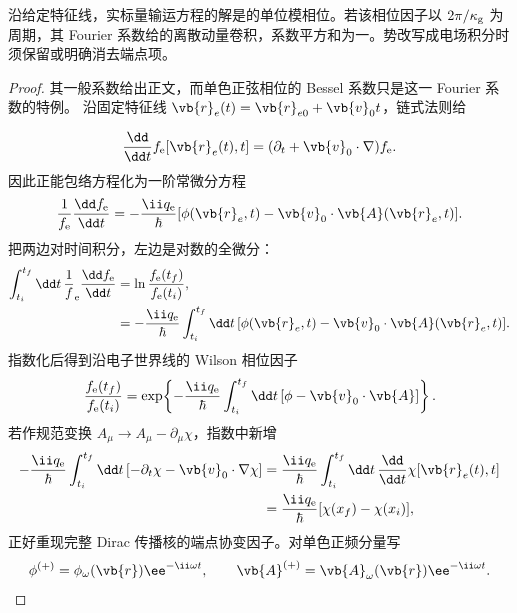 \begin{proposition}[实周期程函相位的动量卷积]
沿给定特征线，实标量输运方程的解是的单位模相位。若该相位因子以 $2\pi/\kappa_{\rm g}$ 为周期，其 Fourier 系数给的离散动量卷积，系数平方和为一。势改写成电场积分时须保留或明确消去端点项。
\end{proposition}
\begin{proof}
其一般系数给出正文，而单色正弦相位的 Bessel 系数只是这一 Fourier 系数的特例。 沿固定特征线 $\vb{r}_e(t)=\vb{r}_{e0}+\vb{v}_0t$，链式法则给

\begin{equation*}
\frac{\dd}{\dd t}f_{\mathrm e}[\vb{r}_e(t),t]
=(\partial_t+\vb{v}_0\cdot\nabla)f_{\mathrm e}.
\end{equation*}
因此正能包络方程化为一阶常微分方程
\begin{equation*}
\frac{1}{f_{\mathrm e}}\frac{\dd f_{\mathrm e}}{\dd t}
=-\frac{\ii q_{\mathrm e}}{\hbar}
[\phi(\vb{r}_e,t)-\vb{v}_0\cdot\vb{A}(\vb{r}_e,t)].
\end{equation*}
把两边对时间积分，左边是对数的全微分：
\begin{align*}
\int_{t_i}^{t_f}\dd t\,\frac1f_{\mathrm e}\frac{\dd f_{\mathrm e}}{\dd t}
&=\ln\frac{f_{\mathrm e}(t_f)}{f_{\mathrm e}(t_i)},\\
&=-\frac{\ii q_{\mathrm e}}{\hbar}\int_{t_i}^{t_f}\dd t\,
[\phi(\vb{r}_e,t)-\vb{v}_0\cdot\vb{A}(\vb{r}_e,t)].
\end{align*}
指数化后得到沿电子世界线的 Wilson 相位因子
\begin{equation*}
\frac{f_{\mathrm e}(t_f)}{f_{\mathrm e}(t_i)}
=\exp\!\left\{-\frac{\ii q_{\mathrm e}}{\hbar}\int_{t_i}^{t_f}\dd t\,
[\phi-\vb{v}_0\cdot\vb{A}]\right\}.
\end{equation*}
若作规范变换
$A_\mu\to A_\mu-\partial_\mu\chi$，指数中新增
\begin{align*}
-\frac{\ii q_{\mathrm e}}{\hbar}
\int_{t_i}^{t_f}\dd t\,
[-\partial_t\chi-\vb{v}_0\cdot\nabla\chi]
&=\frac{\ii q_{\mathrm e}}{\hbar}
\int_{t_i}^{t_f}\dd t\,\frac{\dd}{\dd t}\chi[\vb{r}_e(t),t]\\
&=\frac{\ii q_{\mathrm e}}{\hbar}[\chi(x_f)-\chi(x_i)],
\end{align*}
正好重现完整 Dirac 传播核的端点协变因子。对单色正频分量写
\begin{equation*}
\phi^{(+)}=\phi_\omega(\vb{r})\ee^{-\ii\omega t},
\qquad
\vb{A}^{(+)}=\vb{A}_\omega(\vb{r})\ee^{-\ii\omega t}.

\end{equation*}
\end{proof}
